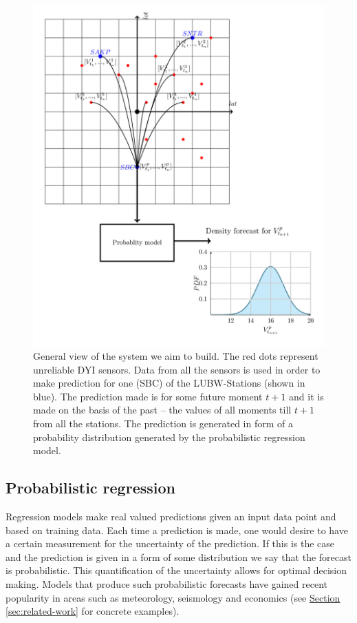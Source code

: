 \documentclass[12pt,a4paper,twoside]{scrartcl}
\numberwithin{equation}{section}
\newcommand{\refsec}[1]{\hyperref[#1]{Section \ref*{#1}}}
\begin{document}
\begin{center}
  \begin{figure}[htbp]
    \centering
    \includegraphics[height=1\textwidth, width=1\textwidth]{figures/general_system.png}
    \caption[General system]{General view of the system we aim to build. The red dots represent unreliable DYI sensors. Data from all the sensors is used in order to make prediction for one (SBC) of the LUBW-Stations (shown in blue). The prediction made is for some future moment \(t+1\) and it is made on the basis of the past -- the values of all moments till \(t+1\) from all the stations. The prediction is generated in form of a probability distribution generated by the probabilistic regression model.}\label{fig:general}
  \end{figure}
\end{center}
\subsection{Probabilistic regression}\label{sec:prob-regression}
Regression models make real valued predictions given an input data point and based on training data. Each time a prediction is made, one would desire to have a certain measurement for the uncertainty of the prediction. If this is the case and the prediction is given in a form of some distribution we say that the forecast is probabilistic. This quantification of the uncertainty allows for optimal decision making. Models that produce such probabilistic forecasts have gained recent popularity in areas such as meteorology, seismology and economics (see \refsec{sec:related-work} for concrete examples).
\end{document}
